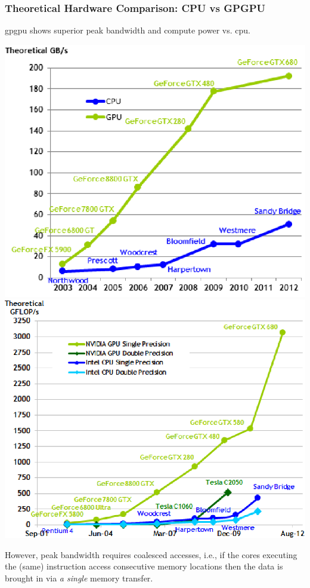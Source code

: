 \documentclass{beamer}
\newcommand{\emp}[1]{\textcolor{DikuRed}{ #1}}
\begin{document}
\begin{frame}
  \frametitle{Theoretical Hardware Comparison: CPU vs GPGPU} %

\smallskip

{\sc gpgpu} shows superior peak bandwidth and compute power vs. {\sc cpu}.

\smallskip

\begin{center} 
\includegraphics[height=27ex]{ParTeaserFigs/Bandwidth.png}  
\includegraphics[height=27ex]{ParTeaserFigs/GFlops.png}
\end{center} 

\smallskip

\emp{However, peak bandwidth requires coalesced accesses}, i.e., if the cores executing
the (same) instruction access consecutive memory locations then the data is brought in
via {\em a single} memory transfer.

\end{frame}
\end{document}
